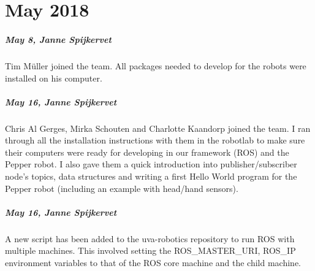 
\chapter{May 2018}
\label{ch:may-2018}


\paragraph{May 8, Janne Spijkervet}
Tim Müller joined the team. All packages needed to develop for the robots were installed on his computer.

\paragraph{May 16, Janne Spijkervet}
Chris Al Gerges, Mirka Schouten and Charlotte Kaandorp joined the team. I ran through all the installation instructions with them in the robotlab to make sure their computers were ready for developing in our framework (ROS) and the Pepper robot. I also gave them a quick introduction into publisher/subscriber node's topics, data structures and writing a first Hello World program for the Pepper robot (including an example with head/hand sensors).

\paragraph{May 16, Janne Spijkervet}
A new script has been added to the uva-robotics repository to run ROS with multiple machines. This involved setting the ROS\_MASTER\_URI, ROS\_IP environment variables to that of the ROS core machine and the child machine.
\bigskip

